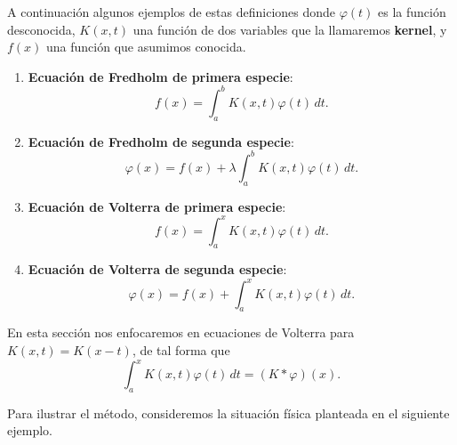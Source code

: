 A continuación algunos ejemplos de estas definiciones donde $\varphi(t)$ es la función desconocida, $K(x,t)$ una función de dos variables que la llamaremos \textbf{kernel}, y $f(x)$ una función que asumimos conocida.

\begin{enumerate}
    \item \textbf{Ecuación de Fredholm de primera especie}:
    $$f(x) = \int_a^b K(x,t) \varphi(t) \,dt.$$

    \item \textbf{Ecuación de Fredholm de segunda especie}:
    $$\varphi(x) = f(x) + \lambda \int_a^b K(x,t) \varphi(t) \,dt.$$

    \item \textbf{Ecuación de Volterra de primera especie}:
    $$f(x) = \int_a^x K(x,t) \varphi(t) \,dt.$$

    \item \textbf{Ecuación de Volterra de segunda especie}:
    $$\varphi(x) = f(x) + \int_a^x K(x,t) \varphi(t) \,dt.$$
\end{enumerate}

En esta sección nos enfocaremos en ecuaciones de Volterra para $K(x,t) = K(x-t)$, de tal forma que
$$\int_a^x K(x,t) \varphi(t) \,dt = (K * \varphi)(x).$$

Para ilustrar el método, consideremos la situación física planteada en el siguiente ejemplo.

